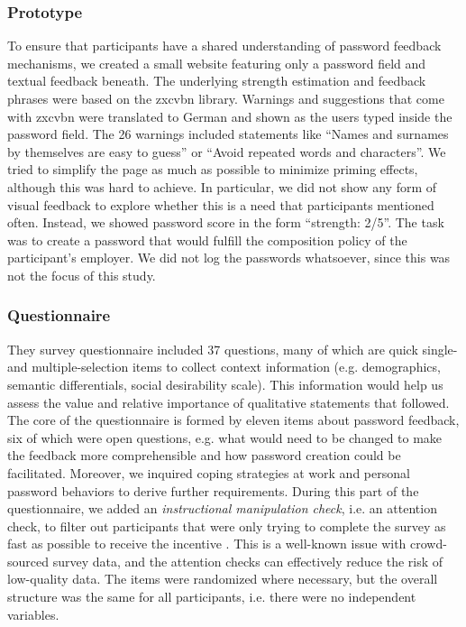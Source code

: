 
\subsubsection{Prototype}
To ensure that participants have a shared understanding of password feedback mechanisms, we created a small website featuring only a password field and textual feedback beneath. The underlying strength estimation and feedback phrases were based on the zxcvbn library. Warnings and suggestions that come with zxcvbn were translated to German and shown as the users typed inside the password field. The 26 warnings included statements like ``Names and surnames by themselves are easy to guess'' or ``Avoid repeated words and characters''. We tried to simplify the page as much as possible to minimize priming effects, although this was hard to achieve. In particular, we did not show any form of visual feedback to explore whether this is a need that participants mentioned often. Instead, we showed password score in the form ``strength: 2/5''.  The task was to create a password that would fulfill the composition policy of the participant's employer. We did not log the passwords whatsoever, since this was not the focus of this study. 

\subsubsection{Questionnaire}
They survey questionnaire included 37 questions, many of which are quick single- and multiple-selection items to collect context information (e.g. demographics, semantic differentials, social desirability scale). This information would help us assess the value and relative importance of qualitative statements that followed. The core of the questionnaire is formed by eleven items about password feedback, six of which were open questions, e.g. what would need to be changed to make the feedback more comprehensible and how password creation could be facilitated. Moreover, we inquired coping strategies at work and personal password behaviors to derive further requirements. During this part of the questionnaire, we added an \textit{instructional manipulation check}, i.e. an attention check, to filter out participants that were only trying to complete the survey as fast as possible to receive the incentive \cite{Oppenheimer2009InstructionalManipulationChecks}. This is a well-known issue with crowd-sourced survey data, and the attention checks can effectively reduce the risk of low-quality data. The items were randomized where necessary, but the overall structure was the same for all participants, i.e. there were no independent variables. 

